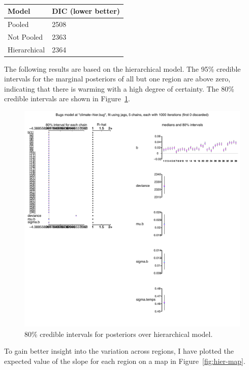 \documentclass{article}
\begin{document}
\begin{table}[h]
\centering
\begin{tabular}{ | l | l | }
  \hline
  Model & DIC (lower better) \\ \hline
  Pooled & 2508 \\ \hline
  Not Pooled & 2363 \\ \hline
  Hierarchical & 2364 \\ \hline
\end{tabular}
\caption{}
\label{table:dic}
\end{table}

The following results are based on the hierarchical model.
The 95\% credible intervals for the marginal posteriors of all but one region are above zero, 
indicating that there is warming with a high degree of certainty.
 The 80\% credible intervals are shown in Figure~\ref{fig:hier-posteriors}. 
\begin{figure}[h]
\centering
\includegraphics[scale=1.5]{figs/hier-posteriors-cropped.pdf}
\caption{80\% credible intervals for posteriors over hierarchical model.}
\label{fig:hier-posteriors}
\end{figure}
To gain better insight into the variation across regions, 
I have plotted the expected value of the slope for each region on a map
in Figure~\ref{fig:hier-map}.
\end{document}
